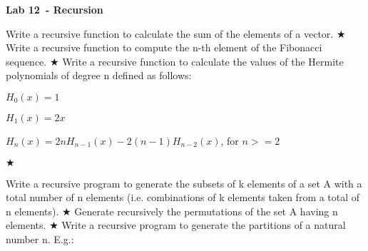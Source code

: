 \documentclass{exam}
\newcommand\labnr{12}
\newcommand\lab{Lab \labnr\ - Recursion}
\newcommand\lvlez{$\bigstar$}
\begin{document}
\begin{center}
   \vspace*{0cm}
   \bfseries\LARGE
   \lab
   \vspace*{1cm}
\end{center}

\begin{questions}
  \question Write a recursive function to calculate the sum of the elements of a vector. \lvlez
  \question Write a recursive function to compute the n-th element of the Fibonacci sequence. \lvlez
  \question Write a recursive function to calculate the values of the Hermite polynomials of degree n defined as follows:

$H_0(x) = 1$

$H_1(x) = 2x$

  $H_n(x) = 2nH_{n-1}(x)-2(n-1)H_{n-2}(x)$, for $n>=2$

\lvlez

  \question Write a recursive program to generate the subsets of k elements of a set A with a total number of n elements (i.e. combinations of k elements taken from a total of n elements). \lvlez
  \question Generate recursively the permutations of the set A having n elements. \lvlez
  \question Write a recursive program to generate the partitions of a natural number
n. E.g.:


\end{questions}
\end{document}
